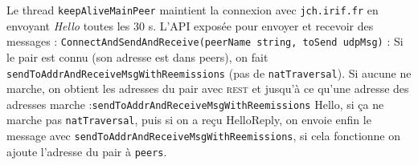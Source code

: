 Le thread \texttt{keepAliveMainPeer} maintient la connexion avec \texttt{jch.irif.fr} en envoyant \textit{Hello} toutes les 30 s.
L'API exposée pour envoyer et recevoir des messages :
\texttt{ConnectAndSendAndReceive(peerName string, toSend udpMsg)} :
Si le pair est connu (son adresse est dans peers), on fait \texttt{sendToAddrAndReceiveMsgWithReemissions} (pas de \texttt{natTraversal}). Si aucune ne marche, on obtient les adresses du pair avec \textsc{rest} et jusqu'à ce qu'une adresse des adresses marche :\texttt{sendToAddrAndReceiveMsgWithReemissions} Hello, si ça ne marche pas \texttt{natTraversal}, puis si on a reçu HelloReply, on envoie enfin le message avec \texttt{sendToAddrAndReceiveMsgWithReemissions}, si cela fonctionne on ajoute l'adresse du pair à \texttt{peers}.
